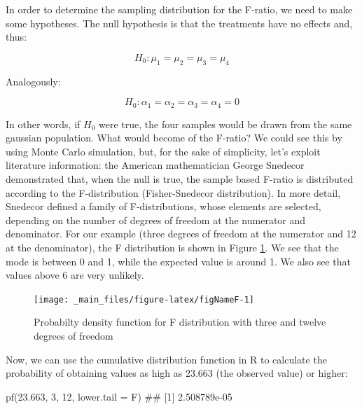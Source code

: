 \documentclass[a4paper,12pt,oneside]{book}
\newenvironment{Shaded}{\begin{snugshade}}{\end{snugshade}}
\newcommand{\DecValTok}[1]{#1}
\newcommand{\FloatTok}[1]{#1}
\newcommand{\DocumentationTok}[1]{#1}
\newcommand{\FunctionTok}[1]{#1}
\newcommand{\AttributeTok}[1]{#1}
\newcommand{\NormalTok}[1]{#1}
\begin{document}
In order to determine the sampling distribution for the F-ratio, we need to make some hypotheses. The null hypothesis is that the treatments have no effects and, thus:

\[H_0: \mu_1 = \mu_2 = \mu_3 = \mu_4\]

Analogously:

\[H_0: \alpha_1 = \alpha_2 = \alpha_3 = \alpha_4 = 0\]

In other words, if \(H_0\) were true, the four samples would be drawn from the same gaussian population. What would become of the F-ratio? We could see this by using Monte Carlo simulation, but, for the sake of simplicity, let's exploit literature information: the American mathematician George Snedecor demonstrated that, when the null is true, the sample based F-ratio is distributed according to the F-distribution (Fisher-Snedecor distribution). In more detail, Snedecor defined a family of F-distributions, whose elements are selected, depending on the number of degrees of freedom at the numerator and denominator. For our example (three degrees of freedom at the numerator and 12 at the denominator), the F distribution is shown in Figure \ref{fig:figNameF}. We see that the mode is between 0 and 1, while the expected value is around 1. We also see that values above 6 are very unlikely.

\begin{figure}

{\centering \texttt{[image: \_main\_files/figure-latex/figNameF-1]} 

}

\caption{Probabilty density function for F distribution with three and twelve degrees of freedom}\label{fig:figNameF}
\end{figure}

Now, we can use the cumulative distribution function in R to calculate the probability of obtaining values as high as 23.663 (the observed value) or higher:

\vspace{12pt}

\begin{Shaded}
\begin{Highlighting}[]
\FunctionTok{pf}\NormalTok{(}\FloatTok{23.663}\NormalTok{, }\DecValTok{3}\NormalTok{, }\DecValTok{12}\NormalTok{, }\AttributeTok{lower.tail =}\NormalTok{ F)}
\DocumentationTok{\#\# [1] 2.508789e{-}05}
\end{Highlighting}
\end{Shaded}
\end{document}
